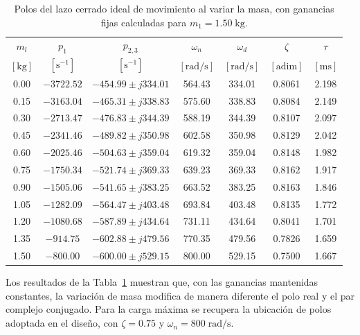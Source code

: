 \documentclass[blue,fullpaper]{ludusofficial}  %
\begin{document}
\begin{table}[!htbp]

    \centering

\small

\caption{Polos del lazo cerrado ideal de movimiento al variar la masa, con ganancias fijas calculadas para $m_1=1.50\;\mathrm{kg}$.}

\label{tab:polos-barrido-masa}

\begin{tabular}{c c c c c c c}
\hline
$m_l$ & $p_1$ & $p_{2,3}$ & $\omega_n$ & $\omega_d$ & $\zeta$ & $\tau$ \\

$[\mathrm{kg} ]$ & $[\mathrm{s^{-1}}]$ & $[\mathrm{s^{-1}}]$ & $[\mathrm{rad/s}]$ & $[\mathrm{rad/s}]$ & $[\mathrm{adim}]$ & $[\mathrm{ms}]$ \\

\hline

0.00 & $-3722.52$ & $-454.99 \pm j334.01$ & 564.43 & 334.01 & 0.8061 & 2.198 \\
0.15 & $-3163.04$ & $-465.31 \pm j338.83$ & 575.60 & 338.83 & 0.8084 & 2.149 \\
0.30 & $-2713.47$ & $-476.83 \pm j344.39$ & 588.19 & 344.39 & 0.8107 & 2.097 \\
0.45 & $-2341.46$ & $-489.82 \pm j350.98$ & 602.58 & 350.98 & 0.8129 & 2.042 \\
0.60 & $-2025.46$ & $-504.63 \pm j359.04$ & 619.32 & 359.04 & 0.8148 & 1.982 \\
0.75 & $-1750.34$ & $-521.74 \pm j369.33$ & 639.23 & 369.33 & 0.8162 & 1.917 \\
0.90 & $-1505.06$ & $-541.65 \pm j383.25$ & 663.52 & 383.25 & 0.8163 & 1.846 \\
1.05 & $-1282.09$ & $-564.47 \pm j403.48$ & 693.84 & 403.48 & 0.8135 & 1.772 \\
1.20 & $-1080.68$ & $-587.89 \pm j434.64$ & 731.11 & 434.64 & 0.8041 & 1.701 \\
1.35 & $-914.75$ & $-602.88 \pm j479.56$ & 770.35 & 479.56 & 0.7826 & 1.659 \\
1.50 & $-800.00$ & $-600.00 \pm j529.15$ & 800.00 & 529.15 & 0.7500 & 1.667 \\

\hline
\end{tabular}
\end{table}

Los resultados de la Tabla~\ref{tab:polos-barrido-masa} muestran
que, con las ganancias mantenidas constantes, la variación de
masa modifica de manera diferente el polo real y el par complejo
conjugado. Para la carga máxima se recupera la ubicación de polos
adoptada en el diseño, con $\zeta=0.75$ y
$\omega_n=800\;\mathrm{rad/s}$.
\end{document}
